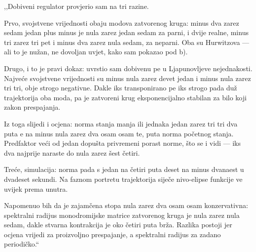 \begin{izgovor}
,,Dobiveni regulator provjerio sam na tri razine.

Prvo, svojstvene vrijednosti obaju modova zatvorenog kruga: minus dva zarez
sedam jedan plus minus je nula zarez jedan sedam za parni, i dvije realne, minus
tri zarez tri pet i minus dva zarez nula sedam, za neparni. Oba su Hurwitzova ---
ali to je nužan, ne dovoljan uvjet, kako sam pokazao pod b).

Drugo, i to je pravi dokaz: uvrstio sam dobivenu pe u Ljapunovljeve nejednakosti.
Najveće svojstvene vrijednosti su minus nula zarez devet jedan i minus nula zarez
tri tri, obje strogo negativne. Dakle iks transponirano pe iks strogo pada duž
trajektorija oba moda, pa je zatvoreni krug eksponencijalno stabilan za bilo koji
zakon prespajanja.

Iz toga slijedi i ocjena: norma stanja manja ili jednaka jedan zarez tri tri dva
puta e na minus nula zarez dva osam osam te, puta norma početnog stanja.
Predfaktor veći od jedan dopušta privremeni porast norme, što se i vidi --- iks
dva najprije naraste do nula zarez šest četiri.

Treće, simulacija: norma pada s jedan na četiri puta deset na minus dvanaest u
dvadeset sekundi. Na faznom portretu trajektorija siječe nivo-elipse funkcije ve
uvijek prema unutra.

Napomenuo bih da je zajamčena stopa nula zarez dva osam osam konzervativna:
spektralni radijus monodromijske matrice zatvorenog kruga je nula zarez nula
sedam, dakle stvarna kontrakcija je oko četiri puta brža. Razlika postoji jer
ocjena vrijedi za proizvoljno prespajanje, a spektralni radijus za zadano
periodičko.``
\end{izgovor}
